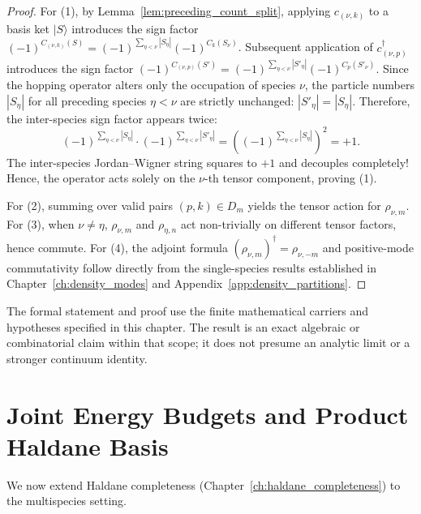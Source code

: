 \begin{proof}
For (1), by Lemma~\ref{lem:preceding_count_split}, applying $c_{(\nu, k)}$ to a basis ket $|S\rangle$ introduces the sign factor $(-1)^{C_{(\nu, k)}(S)} = (-1)^{\sum_{\eta < \nu} |S_\eta|} (-1)^{C_k(S_\nu)}$.
Subsequent application of $c_{(\nu, p)}^\dagger$ introduces the sign factor $(-1)^{C_{(\nu, p)}(S')} = (-1)^{\sum_{\eta < \nu} |S'_\eta|} (-1)^{C_p(S'_\nu)}$.
Since the hopping operator alters only the occupation of species $\nu$, the particle numbers $|S_\eta|$ for all preceding species $\eta < \nu$ are strictly unchanged: $|S'_\eta| = |S_\eta|$.
Therefore, the inter-species sign factor appears twice:
\[
(-1)^{\sum_{\eta < \nu} |S_\eta|} \cdot (-1)^{\sum_{\eta < \nu} |S'_\eta|} = \left( (-1)^{\sum_{\eta < \nu} |S_\eta|} \right)^2 = +1.
\]
The inter-species Jordan--Wigner string squares to $+1$ and decouples completely!
Hence, the operator acts solely on the $\nu$-th tensor component, proving (1).

For (2), summing over valid pairs $(p, k) \in D_m$ yields the tensor action for $\rho_{\nu, m}$.
For (3), when $\nu \neq \eta$, $\rho_{\nu, m}$ and $\rho_{\eta, n}$ act non-trivially on different tensor factors, hence commute.
For (4), the adjoint formula $(\rho_{\nu, m})^\dagger = \rho_{\nu, -m}$ and positive-mode commutativity follow directly from the single-species results established in Chapter~\ref{ch:density_modes} and Appendix~\ref{app:density_partitions}.
\end{proof}

\begin{remark}
The formal statement and proof use the finite mathematical carriers and hypotheses specified in this chapter. The result is an exact algebraic or combinatorial claim within that scope; it does not presume an analytic limit or a stronger continuum identity.
\end{remark}

\section{Joint Energy Budgets and Product Haldane Basis}

We now extend Haldane completeness (Chapter~\ref{ch:haldane_completeness}) to the multispecies setting.

